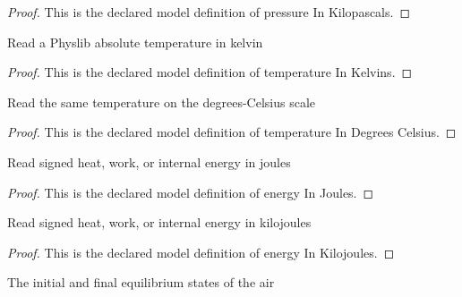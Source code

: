 \begin{proof}
  This is the declared model definition of pressure In Kilopascals.
\end{proof}
\begin{definition}
  \label{def:physics:phyx-mini-0460:phyxminiproblems-problemphyxmini0460-temperatureinkelvins}
  Read a Physlib absolute temperature in kelvin
\end{definition}
\begin{proof}
  This is the declared model definition of temperature In Kelvins.
\end{proof}
\begin{definition}
  \label{def:physics:phyx-mini-0460:phyxminiproblems-problemphyxmini0460-temperatureindegreescelsius}
  Read the same temperature on the degrees-Celsius scale
\end{definition}
\begin{proof}
  This is the declared model definition of temperature In Degrees Celsius.
\end{proof}
\begin{definition}
  \label{def:physics:phyx-mini-0460:phyxminiproblems-problemphyxmini0460-energyinjoules}
  Read signed heat, work, or internal energy in joules
\end{definition}
\begin{proof}
  This is the declared model definition of energy In Joules.
\end{proof}
\begin{definition}
  \label{def:physics:phyx-mini-0460:phyxminiproblems-problemphyxmini0460-energyinkilojoules}
  Read signed heat, work, or internal energy in kilojoules
\end{definition}
\begin{proof}
  This is the declared model definition of energy In Kilojoules.
\end{proof}
\begin{definition}[Endpoint]
  \label{def:physics:phyx-mini-0460:phyxminiproblems-problemphyxmini0460-endpoint}
  The initial and final equilibrium states of the air
\end{definition}
